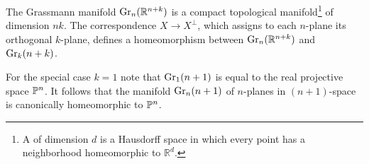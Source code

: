 \documentclass[../main]{subfiles}
\begin{document}
\begin{lemma}\label{lem:05.01}
	The Grassmann manifold $\operatorname{Gr}_n (\mathbb{R}^{n+k})$ is a compact topological manifold\footnote{ A  of dimension $d$ is a Hausdorff space in which every
		point has a neighborhood homeomorphic to $\mathbb{R}^d$.} of dimension $nk$. The correspondence $X \rightarrow X^{\perp}$, which assigns to each $n$-plane its orthogonal $k$-plane, defines a homeomorphism between $\operatorname{Gr}_n (\mathbb{R}^{n+k})$ and $\operatorname{Gr}_{k}(n+k)$.
\end{lemma}
\begin{remark*}
	For the special case $k=1$ note that $\operatorname{Gr}_{1}(n+1)$ is equal to the real projective space $\mathbb{P}^n$. It follows that the manifold $\operatorname{Gr}_{n}(n+1)$ of $n$-planes in $(n+1)$-space is canonically homeomorphic to $\mathbb{P}^n$.
\end{remark*}
\end{document}
